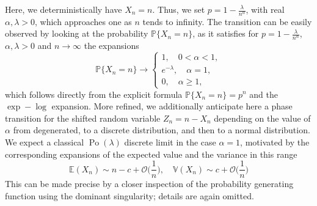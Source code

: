 \documentclass[10pt,reqno,a4paper]{amsart}
\theoremstyle{definition}
\def\P{{\mathbb {P}}}
\def\E{{\mathbb {E}}}
\def\Var{{\mathbb {V}}}
\DeclareMathOperator{\Po}{Po}
\begin{document}
Here, we deterministically have $X_n=n$. Thus, we set $p=1-\frac{\lambda}{n^{\alpha}}$, with real $\alpha,\lambda>0$, which approaches one as $n$ tends to infinity. The transition can be easily observed by looking at the probability $\P\{X_n=n\}$, as it satisfies for $p=1-\frac{\lambda}{n^{\alpha}}$, $\alpha,\lambda>0$ and $n\to \infty$ the expansions
\[
\P\{X_n=n\}\to
\begin{cases}
1,\quad 0<\alpha<1,\\
e^{-\lambda},\quad \alpha=1,\\
0,\quad \alpha\ge 1,
\end{cases}
\]
which follows directly from the explicit formula $\P\{X_n=n\}=p^n$ and the $\exp-\log$ expansion.
More refined, we additionally anticipate here a phase transition for the shifted random variable $Z_n=n-X_n$ depending on the value of $\alpha$ from degenerated, to a discrete distribution, 
and then to a normal distribution. We expect a classical $\Po(\lambda)$ discrete limit in the case $\alpha=1$,
motivated by the corresponding expansions of the expected value and the variance in this range
\[
\E(X_n)\sim n-c+\mathcal{O}\big(\frac1n\big),\quad \Var(X_n)\sim c+\mathcal{O}\big(\frac1n\big)
\]
This can be made precise by a closer inspection of the probability generating function using the dominant singularity; details are again omitted.

\smallskip 
\end{document}
